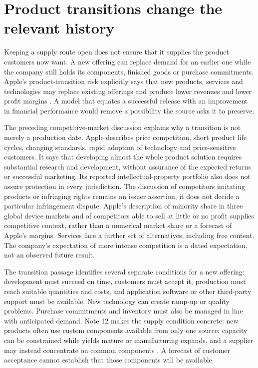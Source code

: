 \section{Product transitions change the relevant history}
\label{sec:apple-competition-transition}

Keeping a supply route open does not ensure that it supplies the product
customers now want. A new offering can replace demand for an earlier one while
the company still holds its components, finished goods or purchase commitments.
Apple's product-transition risk explicitly says that new products, services
and technologies may replace existing offerings and produce lower revenues
and lower profit margins \citep[Risk Factors, printed p.~7]{apple2024}.
A model that equates a successful release with an improvement in financial
performance would remove a possibility the source asks it to preserve.

The preceding competitive-market discussion explains why a transition is not
merely a production date. Apple describes price competition, short product
life cycles, changing standards, rapid adoption of technology and price-sensitive
customers. It says that developing almost the whole product solution requires
substantial research and development, without assurance of the expected returns
or successful marketing. Its reported intellectual-property portfolio also
does not assure protection in every jurisdiction. The discussion of competitors
imitating products or infringing rights remains an issuer assertion; it does
not decide a particular infringement dispute. Apple's description of minority
share in three global device markets and of competitors able to sell at little
or no profit supplies competitive context, rather than a numerical market
share or a forecast of Apple's margins. Services face a further set of
alternatives, including free content. The company's expectation of more
intense competition is a dated expectation, not an observed future result.

The transition passage identifies several separate conditions for a new
offering: development must succeed on time, customers must accept it, production
must reach suitable quantities and costs, and application software or other
third-party support must be available. New technology can create ramp-up or
quality problems. Purchase commitments and inventory must also be managed in
line with anticipated demand. Note 12 makes the supply condition concrete:
new products often use custom components available from only one source;
capacity can be constrained while yields mature or manufacturing expands,
and a supplier may instead concentrate on common components
\citep[Note 12, printed p.~46]{apple2024}. A forecast of customer acceptance
cannot establish that those components will be available.

